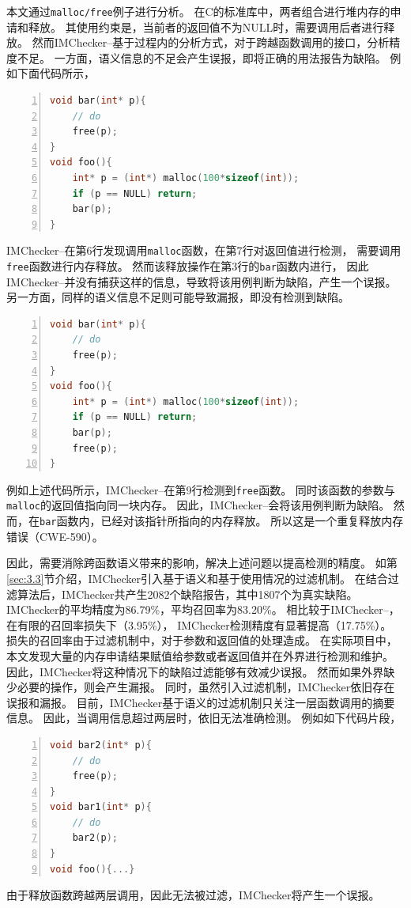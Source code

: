 本文通过\texttt{malloc/free}例子进行分析。
在C的标准库中，两者组合进行堆内存的申请和释放。
其使用约束是，当前者的返回值不为NULL时，需要调用后者进行释放。
然而IMChecker--基于过程内的分析方式，对于跨越函数调用的接口，分析精度不足。
一方面，语义信息的不足会产生误报，即将正确的用法报告为缺陷。
例如下面代码所示，
\begin{lstlisting}[language={C},
basicstyle=\linespread{0.7}\listingsfont,
numbers=left,
xleftmargin=.3\textwidth]
void bar(int* p){
	// do
	free(p);
}
void foo(){
	int* p = (int*) malloc(100*sizeof(int));
	if (p == NULL) return;
	bar(p);
}
\end{lstlisting}
IMChecker--在第6行发现调用\texttt{malloc}函数，在第7行对返回值进行检测，
需要调用\texttt{free}函数进行内存释放。
然而该释放操作在第3行的\texttt{bar}函数内进行，
因此IMChecker--并没有捕获这样的信息，导致将该用例判断为缺陷，产生一个误报。
另一方面，同样的语义信息不足则可能导致漏报，即没有检测到缺陷。
\begin{lstlisting}[language={C},
basicstyle=\linespread{0.7}\listingsfont,
numbers=left,
xleftmargin=.3\textwidth]
void bar(int* p){
	// do
	free(p);
}
void foo(){
	int* p = (int*) malloc(100*sizeof(int));
	if (p == NULL) return;
	bar(p);
	free(p);
}
\end{lstlisting}
例如上述代码所示，IMChecker--在第9行检测到\texttt{free}函数。
同时该函数的参数与\texttt{malloc}的返回值指向同一块内存。
因此，IMChecker--会将该用例判断为缺陷。
然而，在\texttt{bar}函数内，已经对该指针所指向的内存释放。
所以这是一个重复释放内存错误（CWE-590）。

因此，需要消除跨函数语义带来的影响，解决上述问题以提高检测的精度。
如第\ref{sec:3.3}节介绍，IMChecker引入基于语义和基于使用情况的过滤机制。
在结合过滤算法后，IMChecker共产生2082个缺陷报告，其中1807个为真实缺陷。
IMChecker的平均精度为86.79\%，平均召回率为83.20\%。
相比较于IMChecker--，在有限的召回率损失下（3.95\%），
IMChecker检测精度有显著提高（17.75\%）。
损失的召回率由于过滤机制中，对于参数和返回值的处理造成。
在实际项目中，本文发现大量的内存申请结果赋值给参数或者返回值并在外界进行检测和维护。
因此，IMChecker将这种情况下的缺陷过滤能够有效减少误报。
然而如果外界缺少必要的操作，则会产生漏报。
同时，虽然引入过滤机制，IMChecker依旧存在误报和漏报。
目前，IMChecker基于语义的过滤机制只关注一层函数调用的摘要信息。
因此，当调用信息超过两层时，依旧无法准确检测。
例如如下代码片段，
\begin{lstlisting}[language={C},
basicstyle=\linespread{0.7}\listingsfont,
numbers=left,
xleftmargin=.35\textwidth]
void bar2(int* p){        
	// do						   
	free(p);					  
}
void bar1(int* p){        
	// do						   
	bar2(p);					  
}
void foo(){...}
\end{lstlisting}
由于释放函数跨越两层调用，因此无法被过滤，IMChecker将产生一个误报。



